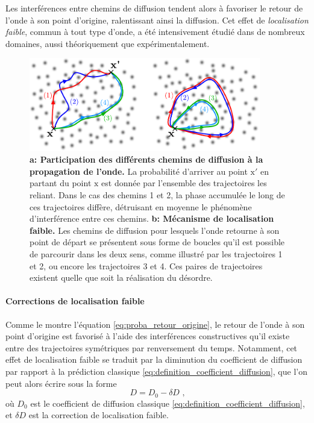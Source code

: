 Les interférences entre chemins de diffusion tendent alors à favoriser le retour de l'onde à son point d'origine, ralentissant ainsi la diffusion. Cet effet de \emph{localisation faible}, commun à tout type d'onde, a été intensivement étudié dans de nombreux domaines, aussi théoriquement que expérimentalement.


\begin{figure}
\centering
\includegraphics[width=0.9\textwidth]{Fig/Localisation/localisation_faible.pdf}
\caption{\textbf{a: Participation des différents chemins de diffusion à la propagation de l'onde.} La probabilité d'arriver au point $\mathrm{x'}$ en partant du point $\mathrm{x}$ est donnée par l'ensemble des trajectoires les reliant. Dans le cas des chemins 1 et 2, la phase accumulée le long de ces trajectoires diffère, détruisant en moyenne le phénomène d'interférence entre ces chemins. \textbf{b: Mécanisme de localisation faible.} Les chemins de diffusion pour lesquels l'onde retourne à son point de départ se présentent sous forme de boucles qu'il est possible de parcourir dans les deux sens, comme illustré par les trajectoires 1 et 2, ou encore les trajectoires 3 et 4. Ces paires de trajectoires existent quelle que soit la réalisation du désordre.}
\label{fig:localisation_faible}
\end{figure}



\paragraph*{Corrections de localisation faible}
Comme le montre l'équation \ref{eq:proba_retour_origine}, le retour de l'onde à son point d'origine est favorisé à l'aide des interférences constructives qu'il existe entre des trajectoires symétriques par renversement du temps. Notamment, cet effet de localisation faible se traduit par la diminution du coefficient de diffusion par rapport à la prédiction classique \ref{eq:definition_coefficient_diffusion}, que l'on peut alors écrire sous la forme
\begin{equation}
D= D_{\mathrm{0}}-\delta D \text{ ,}
\end{equation}
où $D_{\mathrm{0}}$ est le coefficient de diffusion classique \ref{eq:definition_coefficient_diffusion}, et $\delta D$ est la correction de localisation faible.



